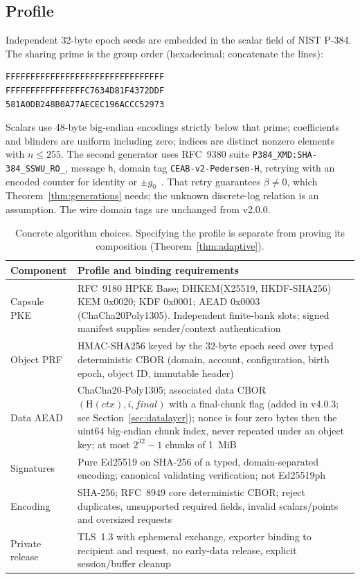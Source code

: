 \documentclass[pdflatex,sn-mathphys-num]{sn-jnl}
\theoremstyle{plain}
\theoremstyle{definition}
\newcommand{\code}[1]{\texttt{#1}}
\begin{document}
\subsection{Profile}\label{sec:profile}
Independent 32-byte epoch seeds are embedded in the scalar field of NIST P-384. The sharing prime is the group order (hexadecimal; concatenate the lines):
\begin{Verbatim}[fontsize=\small]
FFFFFFFFFFFFFFFFFFFFFFFFFFFFFFFF
FFFFFFFFFFFFFFFFC7634D81F4372DDF
581A0DB248B0A77AECEC196ACCC52973
\end{Verbatim}
Scalars use 48-byte big-endian encodings strictly below that prime; coefficients and blinders are uniform including zero; indices are distinct nonzero elements with $n\le255$. The second generator uses RFC~9380 suite \code{P384\_XMD:SHA-384\_SSWU\_RO\_}, message \code{h}, domain tag \code{CEAB-v2-Pedersen-H}, retrying with an encoded counter for identity or $\pm g_0$~\cite{rfc9380,sec2}. That retry guarantees $\beta\ne0$, which Theorem~\ref{thm:generations} needs; the unknown discrete-log relation is an assumption. The wire domain tags are unchanged from v2.0.0.

\begin{table}[htbp]
\caption{Concrete algorithm choices. Specifying the profile is separate from proving its composition (Theorem~\ref{thm:adaptive}).}\label{tab:profile}
\centering\footnotesize
\begin{tabularx}{\linewidth}{@{}p{.24\linewidth}Y@{}}\toprule
Component & Profile and binding requirements\\\midrule
Capsule PKE & RFC~9180 HPKE Base; DHKEM(X25519, HKDF-SHA256) KEM 0x0020; KDF 0x0001; AEAD 0x0003 (ChaCha20Poly1305). Independent finite-bank slots; signed manifest supplies sender/context authentication~\cite{rfc9180}\\
Object PRF & HMAC-SHA256 keyed by the 32-byte epoch seed over typed deterministic CBOR (domain, account, configuration, birth epoch, object ID, immutable header)\\
Data AEAD & ChaCha20-Poly1305; associated data CBOR$(\mathrm{H}(\mathit{ctx}),i,\mathit{final})$ with a final-chunk flag (added in v4.0.3; see Section~\ref{sec:datalayer}); nonce is four zero bytes then the uint64 big-endian chunk index, never repeated under an object key; at most $2^{32}-1$ chunks of 1~MiB~\cite{rfc8439}\\
Signatures & Pure Ed25519 on SHA-256 of a typed, domain-separated encoding; canonical validating verification; not Ed25519ph~\cite{rfc8032}\\
Encoding & SHA-256; RFC~8949 core deterministic CBOR; reject duplicates, unsupported required fields, invalid scalars/points and oversized requests~\cite{rfc8949}\\
Private release & TLS~1.3 with ephemeral exchange, exporter binding to recipient and request, no early-data release, explicit session/buffer cleanup~\cite{rfc8446}\\\bottomrule
\end{tabularx}
\end{table}
\end{document}
